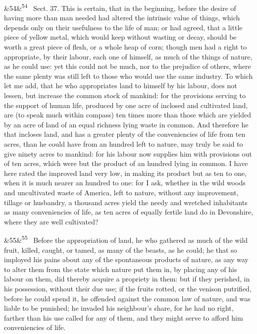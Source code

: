 \documentclass[12pt]{article}
\newcommand{\para}[1][]{\par\noindent\ifx&#1&\else\textsuperscript{\footnotesize #1}~\fi}
\begin{document}
\para[54] Sect. 37. This is certain, that in the beginning, before the desire of having more than man needed had altered the intrinsic value of things, which depends only on their usefulness to the life of man; or had agreed, that a little piece of yellow metal, which would keep without wasting or decay, should be worth a great piece of flesh, or a whole heap of corn; though men had a right to appropriate, by their labour, each one of himself, as much of the things of nature, as he could use: yet this could not be much, nor to the prejudice of others, where the same plenty was still left to those who would use the same industry. To which let me add, that he who appropriates land to himself by his labour, does not lessen, but increase the common stock of mankind: for the provisions serving to the support of human life, produced by one acre of inclosed and cultivated land, are (to speak much within compass) ten times more than those which are yielded by an acre of land of an equal richness lying waste in common. And therefore he that incloses land, and has a greater plenty of the conveniencies of life from ten acres, than he could have from an hundred left to nature, may truly be said to give ninety acres to mankind: for his labour now supplies him with provisions out of ten acres, which were but the product of an hundred lying in common. I have here rated the improved land very low, in making its product but as ten to one, when it is much nearer an hundred to one: for I ask, whether in the wild woods and uncultivated waste of America, left to nature, without any improvement, tillage or husbandry, a thousand acres yield the needy and wretched inhabitants as many conveniencies of life, as ten acres of equally fertile land do in Devonshire, where they are well cultivated?

\para[55] Before the appropriation of land, he who gathered as much of the wild fruit, killed, caught, or tamed, as many of the beasts, as he could; he that so imployed his pains about any of the spontaneous products of nature, as any way to alter them from the state which nature put them in, by placing any of his labour on them, did thereby acquire a propriety in them: but if they perished, in his possession, without their due use; if the fruits rotted, or the venison putrified, before he could spend it, he offended against the common law of nature, and was liable to be punished; he invaded his neighbour's share, for he had no right, farther than his use called for any of them, and they might serve to afford him conveniencies of life.
\end{document}
